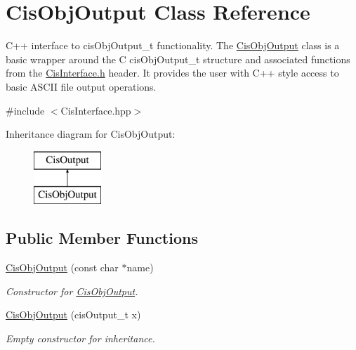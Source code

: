 \hypertarget{classCisObjOutput}{}\section{Cis\+Obj\+Output Class Reference}
\label{classCisObjOutput}


C++ interface to cis\+Obj\+Output\+\_\+t functionality. The \mbox{\hyperlink{classCisObjOutput}{Cis\+Obj\+Output}} class is a basic wrapper around the C cis\+Obj\+Output\+\_\+t structure and associated functions from the \mbox{\hyperlink{CisInterface_8h_source}{Cis\+Interface.\+h}} header. It provides the user with C++ style access to basic A\+S\+C\+II file output operations.  




{\ttfamily \#include $<$Cis\+Interface.\+hpp$>$}

Inheritance diagram for Cis\+Obj\+Output\+:\begin{figure}[H]
\begin{center}
\leavevmode
\includegraphics[height=2.000000cm]{classCisObjOutput}
\end{center}
\end{figure}
\subsection*{Public Member Functions}
\begin{DoxyCompactItemize}
\item 
\mbox{\hyperlink{classCisObjOutput_afb7eecc9487342188c292e4a6889fee9}{Cis\+Obj\+Output}} (const char $\ast$name)
\begin{DoxyCompactList}\small\item\em Constructor for \mbox{\hyperlink{classCisObjOutput}{Cis\+Obj\+Output}}. \end{DoxyCompactList}\item 
\mbox{\label{classCisObjOutput_a0788a59b74f38c7bfd27b21fd39386e7}} 
\mbox{\hyperlink{classCisObjOutput_a0788a59b74f38c7bfd27b21fd39386e7}{Cis\+Obj\+Output}} (cis\+Output\+\_\+t x)
\begin{DoxyCompactList}\small\item\em Empty constructor for inheritance. \end{DoxyCompactList}\end{DoxyCompactItemize}


